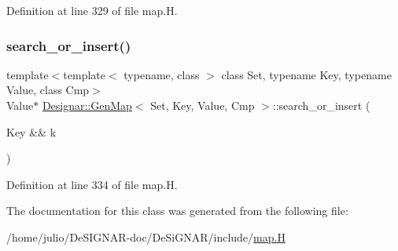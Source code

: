 Definition at line 329 of file map.\+H.

\mbox{\label{class_designar_1_1_gen_map_ae2ab69b26f782abcd99f99944253d8de}} 
\subsubsection{\texorpdfstring{search\+\_\+or\+\_\+insert()}{search\_or\_insert()}\hspace{0.1cm}{\footnotesize\ttfamily [6/6]}}
{\footnotesize\ttfamily template$<$template$<$ typename, class $>$ class Set, typename Key, typename Value, class Cmp$>$ \\
Value$\ast$ \hyperlink{class_designar_1_1_gen_map}{Designar\+::\+Gen\+Map}$<$ Set, Key, Value, Cmp $>$\+::search\+\_\+or\+\_\+insert (\begin{DoxyParamCaption}\item[{Key \&\&}]{k }\end{DoxyParamCaption})\hspace{0.3cm}{\ttfamily [inline]}}



Definition at line 334 of file map.\+H.



The documentation for this class was generated from the following file\+:\begin{DoxyCompactItemize}
\item 
/home/julio/\+De\+S\+I\+G\+N\+A\+R-\/doc/\+De\+Si\+G\+N\+A\+R/include/\hyperlink{map_8_h}{map.\+H}\end{DoxyCompactItemize}
